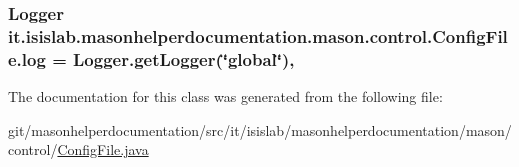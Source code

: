 \hypertarget{classit_1_1isislab_1_1masonhelperdocumentation_1_1mason_1_1control_1_1_config_file_a1e0cc7c39d846dcf3dd9def42f836e89}{
\subsubsection[{log}]{\setlength{\rightskip}{0pt plus 5cm}Logger it.\-isislab.\-masonhelperdocumentation.\-mason.\-control.\-Config\-File.\-log = Logger.\-get\-Logger(\char`\"{}global\char`\"{})\hspace{0.3cm}{\ttfamily [static]}, {\ttfamily [private]}}}\label{classit_1_1isislab_1_1masonhelperdocumentation_1_1mason_1_1control_1_1_config_file_a1e0cc7c39d846dcf3dd9def42f836e89}


The documentation for this class was generated from the following file\-:\begin{DoxyCompactItemize}
\item 
git/masonhelperdocumentation/src/it/isislab/masonhelperdocumentation/mason/control/\hyperlink{_config_file_8java}{Config\-File.\-java}\end{DoxyCompactItemize}

